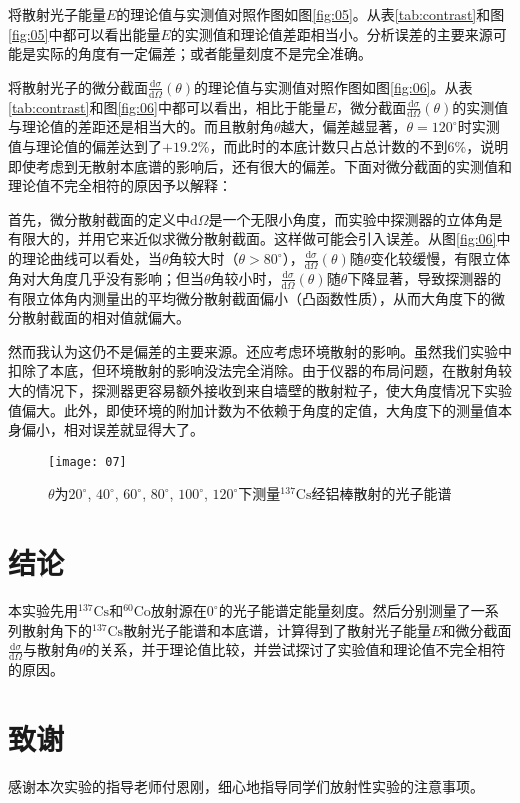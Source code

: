 \documentclass[aps,pre,12pt,preprint,onecolumn,showpacs,showkeys]{revtex4-1}
\def \d {\mathrm d}
\def \cs {\frac{\d \sigma}{\d \Omega}(\theta)}
\def \Cs {^{137}\mathrm{Cs}}
\def \Co{^{60}\mathrm{Co}}
\def \degree {^\circ}
\begin{document}
将散射光子能量$E$的理论值与实测值对照作图如图\ref{fig:05}。从表\ref{tab:contrast}和图\ref{fig:05}中都可以看出能量$E$的实测值和理论值差距相当小。分析误差的主要来源可能是实际的角度有一定偏差；或者能量刻度不是完全准确。

将散射光子的微分截面$\cs$的理论值与实测值对照作图如图\ref{fig:06}。从表\ref{tab:contrast}和图\ref{fig:06}中都可以看出，相比于能量$E$，微分截面$\cs$的实测值与理论值的差距还是相当大的。而且散射角$\theta$越大，偏差越显著，$\theta=120\degree$时实测值与理论值的偏差达到了$+19.2\%$，而此时的本底计数只占总计数的不到6\%，说明即使考虑到无散射本底谱的影响后，还有很大的偏差。下面对微分截面的实测值和理论值不完全相符的原因予以解释：

首先，微分散射截面的定义中$\d \Omega$是一个无限小角度，而实验中探测器的立体角是有限大的，并用它来近似求微分散射截面。这样做可能会引入误差。从图\ref{fig:06}中的理论曲线可以看处，当$\theta$角较大时（$\theta>80\degree$），$\cs$随$\theta$变化较缓慢，有限立体角对大角度几乎没有影响；但当$\theta$角较小时，$\cs$随$\theta$下降显著，导致探测器的有限立体角内测量出的平均微分散射截面偏小（凸函数性质），从而大角度下的微分散射截面的相对值就偏大。

然而我认为这仍不是偏差的主要来源。还应考虑环境散射的影响。虽然我们实验中扣除了本底，但环境散射的影响没法完全消除。由于仪器的布局问题，在散射角较大的情况下，探测器更容易额外接收到来自墙壁的散射粒子，使大角度情况下实验值偏大。此外，即使环境的附加计数为不依赖于角度的定值，大角度下的测量值本身偏小，相对误差就显得大了。

\begin{figure}[h]
\centering
\texttt{[image: 07]}
\caption{\label{fig:07}%
$\theta$为$20\degree$, $40\degree$, $60\degree$, $80\degree$, $100\degree$, $120\degree$下测量$\Cs$经铝棒散射的光子能谱}
\end{figure}

\section{结论}
本实验先用$\Cs$和$\Co$放射源在$0\degree$的光子能谱定能量刻度。然后分别测量了一系列散射角下的$\Cs$散射光子能谱和本底谱，计算得到了散射光子能量$E$和微分截面$\frac{\mathrm{d} \sigma}{\mathrm{d}\Omega}$与散射角$\theta$的关系，并于理论值比较，并尝试探讨了实验值和理论值不完全相符的原因。

\section{致谢}
感谢本次实验的指导老师付恩刚，细心地指导同学们放射性实验的注意事项。
\end{document}
